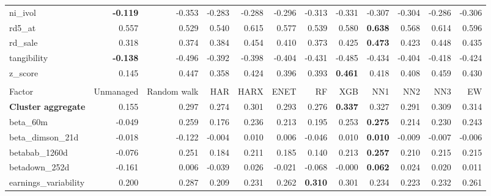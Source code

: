 \begin{landscape}
\begin{longtable}{>{\raggedright\arraybackslash}p{2.6cm}rrrrrrrrrrr}
ni\_ivol & \textbf{-0.119} & -0.353 & -0.283 & -0.288 & -0.296 & -0.313 & -0.331 & -0.307 & -0.304 & -0.286 & -0.306 \\
rd5\_at & 0.557 & 0.529 & 0.540 & \cellcolor{blue!10}0.615 & \cellcolor{blue!10}0.577 & 0.539 & \cellcolor{blue!10}0.580 & \textbf{\cellcolor{blue!10}0.638} & \cellcolor{blue!10}0.568 & \cellcolor{blue!10}0.614 & \cellcolor{blue!10}0.596 \\
rd\_sale & 0.318 & 0.374 & \cellcolor{blue!10}0.384 & \cellcolor{blue!10}0.454 & \cellcolor{blue!10}0.410 & 0.373 & \cellcolor{blue!10}0.425 & \textbf{\cellcolor{blue!10}0.473} & \cellcolor{blue!10}0.423 & \cellcolor{blue!10}0.448 & \cellcolor{blue!10}0.435 \\
tangibility & \textbf{-0.138} & -0.496 & -0.392 & -0.398 & -0.404 & -0.431 & -0.485 & -0.434 & -0.404 & -0.418 & -0.424 \\
z\_score & 0.145 & 0.447 & 0.358 & 0.424 & 0.396 & 0.393 & \textbf{\cellcolor{blue!10}0.461} & 0.418 & 0.408 & \cellcolor{blue!10}0.459 & 0.430 \\
\hline
\multicolumn{12}{@{}l}{\textit{Panel E. Low Risk}} \\
\hline
Factor & Unmanaged & Random walk & HAR & HARX & ENET & RF & XGB & NN1 & NN2 & NN3 & EW \\
\hline
\textbf{Cluster aggregate} & 0.155 & 0.297 & 0.274 & \cellcolor{blue!10}0.301 & 0.293 & 0.276 & \textbf{\cellcolor{blue!10}0.337} & \cellcolor{blue!10}0.327 & 0.291 & \cellcolor{blue!10}0.309 & \cellcolor{blue!10}0.314 \\
beta\_60m & -0.049 & 0.259 & 0.176 & 0.236 & 0.213 & 0.195 & 0.253 & \textbf{\cellcolor{blue!10}0.275} & 0.214 & 0.230 & 0.243 \\
beta\_dimson\_21d & -0.018 & -0.122 & \cellcolor{blue!10}-0.004 & \cellcolor{blue!10}0.010 & \cellcolor{blue!10}0.006 & -0.046 & \cellcolor{blue!10}0.010 & \textbf{\cellcolor{blue!10}0.010} & \cellcolor{blue!10}-0.009 & \cellcolor{blue!10}-0.007 & \cellcolor{blue!10}-0.006 \\
betabab\_1260d & -0.076 & 0.251 & 0.184 & 0.211 & 0.185 & 0.140 & 0.213 & \textbf{\cellcolor{blue!10}0.257} & 0.210 & 0.215 & 0.215 \\
betadown\_252d & -0.161 & 0.006 & -0.039 & \cellcolor{blue!10}0.026 & -0.021 & -0.068 & -0.000 & \textbf{\cellcolor{blue!10}0.062} & \cellcolor{blue!10}0.024 & \cellcolor{blue!10}0.020 & \cellcolor{blue!10}0.011 \\
earnings\_variability & 0.200 & 0.287 & 0.209 & 0.231 & 0.262 & \textbf{\cellcolor{blue!10}0.310} & \cellcolor{blue!10}0.301 & 0.234 & 0.223 & 0.232 & 0.261 \\

\end{longtable}
\end{landscape}
